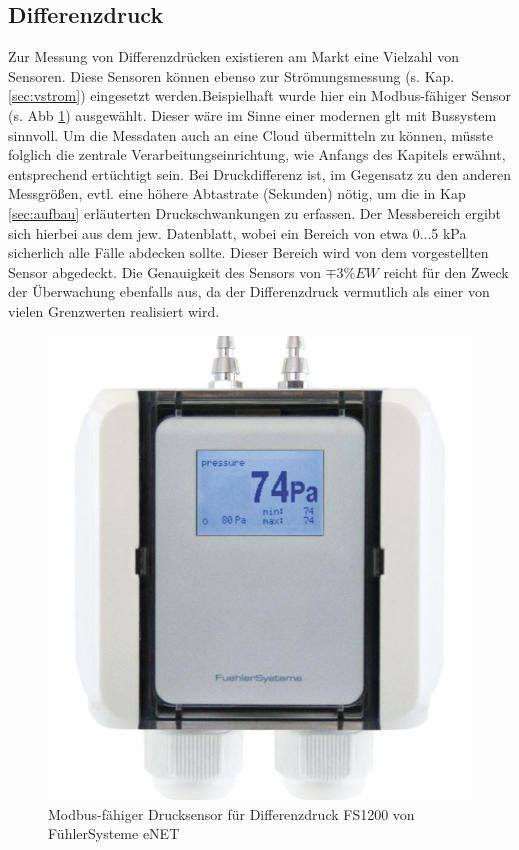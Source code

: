     \subsection{Differenzdruck}
    Zur Messung von Differenzdrücken existieren am Markt eine Vielzahl von Sensoren. Diese Sensoren können ebenso zur Strömungsmessung (s. Kap. \ref{sec:vstrom}) eingesetzt werden.Beispielhaft wurde hier ein Modbus-fähiger Sensor (s. Abb \ref{fi:drucksensor}) ausgewählt. Dieser wäre im Sinne einer modernen \ac{glt} mit Bussystem sinnvoll. Um die Messdaten auch an eine Cloud übermitteln zu können, müsste folglich die zentrale Verarbeitungseinrichtung, wie Anfangs des Kapitels erwähnt, entsprechend ertüchtigt sein. Bei Druckdifferenz ist, im Gegensatz zu den anderen Messgrößen, evtl. eine höhere Abtastrate (Sekunden) nötig, um die in Kap \ref{sec:aufbau} erläuterten Druckschwankungen zu erfassen. Der Messbereich ergibt sich hierbei aus dem jew. Datenblatt, wobei ein Bereich von etwa 0...5 kPa sicherlich alle Fälle abdecken sollte. Dieser Bereich wird von dem vorgestellten Sensor abgedeckt. Die Genauigkeit des Sensors von $\mp 3\% EW$ reicht für den Zweck der Überwachung ebenfalls aus, da der Differenzdruck vermutlich als einer von vielen Grenzwerten realisiert wird. 
    \begin{figure}[H]
        \begin{center}
            \includegraphics[width=0.5\linewidth]{images/drucksensor.png}
            \caption[Differenzdruck Messumformer]{Modbus-fähiger Drucksensor für Differenzdruck FS1200 von FühlerSysteme eNET \cite{drucksensor} }
            \label{fi:drucksensor}
        \end{center}
    \end{figure} 
